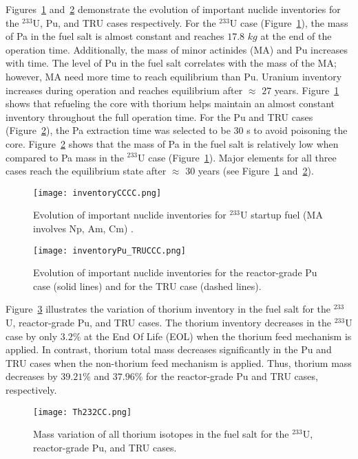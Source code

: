Figures~\ref{fig:inventoryCCCC} and~\ref{fig:inventoryPu_TRUCCC} demonstrate 
the evolution of important nuclide inventories for the $^{233}$U, Pu, and TRU cases 
respectively. For the $^{233}$U case (Figure~\ref{fig:inventoryCCCC}), the mass of Pa in the fuel salt is almost constant and reaches 
$17.8$  $kg$ at the end of the operation time. 
Additionally, the mass of minor actinides (MA) and Pu increases with time. The level of Pu in the fuel salt correlates with the mass of the MA; however, MA need more time to reach equilibrium than Pu. Uranium inventory increases during 
operation and reaches equilibrium after $\approx$ $27$ years. Figure~\ref{fig:inventoryCCCC} shows that refueling the core with thorium helps 
maintain an almost constant inventory throughout the full operation time. 
For the Pu and TRU cases (Figure~\ref{fig:inventoryPu_TRUCCC}), the Pa extraction time was selected to be 30 s 
to avoid poisoning the core. Figure~\ref{fig:inventoryPu_TRUCCC} shows that the mass of Pa in the fuel salt 
is relatively low when compared to Pa mass in the $^{233}$U case (Figure~\ref{fig:inventoryCCCC}). Major 
elements for all three cases reach the equilibrium state after $\approx$ $30$ 
years (see Figure~\ref{fig:inventoryCCCC} and~\ref{fig:inventoryPu_TRUCCC}).
\begin{figure}
	\centering
	\texttt{[image: inventoryCCCC.png]}
	\vspace{-0.4in}
	\caption{Evolution of important nuclide inventories for $^{233}$U 
		startup fuel (MA involves Np, Am, Cm) \cite{ashraf2019whole_core}.}
	\label{fig:inventoryCCCC}
\end{figure}
\begin{figure}
	\centering
	\texttt{[image: inventoryPu\_TRUCCC.png]}
	\vspace{-0.5in}
	\caption{Evolution of important nuclide inventories for the 
		reactor-grade Pu case (solid lines) and for the TRU case (dashed lines).}
	\label{fig:inventoryPu_TRUCCC}
\end{figure}

Figure~\ref{fig:Th232CC} illustrates the variation of thorium inventory in the 
fuel salt for the $^{233}$U, reactor-grade Pu, and TRU cases. The thorium inventory 
decreases in the $^{233}$U case by only $3.2$\% at the End Of Life (EOL) when the thorium 
feed mechanism is applied. 
In contrast, thorium total mass decreases significantly in the Pu and TRU cases when the non-thorium 
feed mechanism is applied. Thus, thorium mass decreases by $39.21$\% and 
$37.96$\% for the reactor-grade Pu and TRU cases, respectively.
\begin{figure}
	\centering
	\texttt{[image: Th232CC.png]}
	\caption{Mass variation of all thorium isotopes in the fuel salt for the $^{233}$U, reactor-grade Pu, and TRU cases.}
	\label{fig:Th232CC}
\end{figure}

